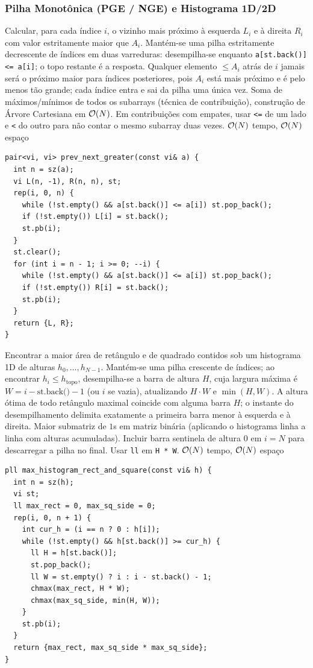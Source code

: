 \subsubsection{Pilha Monotônica (PGE / NGE) e Histograma 1D/2D}
\algobox
  {Calcular, para cada índice $i$, o vizinho mais próximo à esquerda $L_i$ e à direita $R_i$ com valor estritamente maior que $A_i$.}
  {Mantém-se uma pilha estritamente decrescente de índices em duas varreduras: desempilha-se enquanto \texttt{a[st.back()] <= a[i]}; o topo restante é a resposta.}
  {Qualquer elemento $\le A_i$ atrás de $i$ jamais será o próximo maior para índices posteriores, pois $A_i$ está mais próximo e é pelo menos tão grande; cada índice entra e sai da pilha uma única vez.}
  {Soma de máximos/mínimos de todos os subarrays (técnica de contribuição), construção de Árvore Cartesiana em $\mathcal{O}(N)$.}
  {Em contribuições com empates, usar \texttt{<=} de um lado e \texttt{<} do outro para não contar o mesmo subarray duas vezes.}
  {$\mathcal{O}(N)$ tempo, $\mathcal{O}(N)$ espaço}

\begin{lstlisting}
pair<vi, vi> prev_next_greater(const vi& a) {
  int n = sz(a);
  vi L(n, -1), R(n, n), st;
  rep(i, 0, n) {
    while (!st.empty() && a[st.back()] <= a[i]) st.pop_back();
    if (!st.empty()) L[i] = st.back();
    st.pb(i);
  }
  st.clear();
  for (int i = n - 1; i >= 0; --i) {
    while (!st.empty() && a[st.back()] <= a[i]) st.pop_back();
    if (!st.empty()) R[i] = st.back();
    st.pb(i);
  }
  return {L, R};
}
\end{lstlisting}

\algobox
  {Encontrar a maior área de retângulo e de quadrado contidos sob um histograma 1D de alturas $h_0, \dots, h_{N-1}$.}
  {Mantém-se uma pilha crescente de índices; ao encontrar $h_i \le h_{\text{topo}}$, desempilha-se a barra de altura $H$, cuja largura máxima é $W = i - \text{st.back()} - 1$ (ou $i$ se vazia), atualizando $H \cdot W$ e $\min(H, W)$.}
  {A altura ótima de todo retângulo maximal coincide com alguma barra $H$; o instante do desempilhamento delimita exatamente a primeira barra menor à esquerda e à direita.}
  {Maior submatriz de $1$s em matriz binária (aplicando o histograma linha a linha com alturas acumuladas).}
  {Incluir barra sentinela de altura $0$ em $i = N$ para descarregar a pilha no final. Usar \texttt{ll} em \texttt{H * W}.}
  {$\mathcal{O}(N)$ tempo, $\mathcal{O}(N)$ espaço}

\begin{lstlisting}
pll max_histogram_rect_and_square(const vi& h) {
  int n = sz(h);
  vi st;
  ll max_rect = 0, max_sq_side = 0;
  rep(i, 0, n + 1) {
    int cur_h = (i == n ? 0 : h[i]);
    while (!st.empty() && h[st.back()] >= cur_h) {
      ll H = h[st.back()];
      st.pop_back();
      ll W = st.empty() ? i : i - st.back() - 1;
      chmax(max_rect, H * W);
      chmax(max_sq_side, min(H, W));
    }
    st.pb(i);
  }
  return {max_rect, max_sq_side * max_sq_side};
}
\end{lstlisting}

